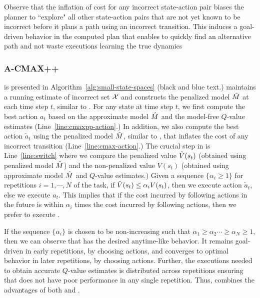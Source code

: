 Observe that the inflation of cost for any incorrect state-action pair
biases the planner to ``explore" all other state-action pairs that are
not yet known to be incorrect before it plans a path using an
incorrect transition. This induces a goal-driven behavior in the
computed plan that enables \cmax{} to quickly find an alternative path
and not waste executions learning the true dynamics

\subsubsection{A-CMAX++}
\label{sec:acmaxpp}
\acmaxpp{} is presented in
Algorithm~\ref{alg:small-state-spaces} (black and blue text.)
\acmaxpp{} maintains a running estimate of incorrect set
$\mathcal{X}$ and constructs the penalized model $\tilde{M}$ at each
time step $t$, similar to \cmax{}. For any state at time step $t$, we
first compute the best action $a_t$ based on the approximate model
$\hat{M}$ and the model-free $Q$-value estimates
(Line~\ref{line:cmaxpp-action}.) In addition, we also compute the best
action $\tilde{a}_t$ using the penalized model $\tilde{M}$, similar to
\cmax{}, that inflates the cost of any incorrect transition
(Line~\ref{line:cmax-action}.) The crucial step in \acmaxpp{}
is Line~\ref{line:switch} where we compare the penalized value
$\tilde{V}(s_t)$ (obtained using penalized model $\tilde{M}$) and the
non-penalized value $V(s_t)$ (obtained using approximate model $\hat{M}$
and $Q$-value estimates.) Given a sequence $\{\alpha_i \geq 1\}$ for
repetitions $i=1,\cdots,N$ of the task, if $\tilde{V}(s_t) \leq
\alpha_iV(s_t)$, then we execute action $\tilde{a}_t$, else we execute
$a_t$. This implies that if the cost incurred by following \cmax{}
actions in the future is within $\alpha_i$ times the cost incurred by
following \cmaxpp{} actions, then we prefer to execute \cmax{}.

If
the sequence $\{\alpha_i\}$ is chosen to be non-increasing such that
$\alpha_1 \geq \alpha_2 \cdots \geq \alpha_N \geq 1$, then we can observe that
\acmaxpp{} has the desired anytime-like behavior. It remains goal-driven in
early repetitions, by choosing \cmax{} actions, and
converges to optimal behavior in later repetitions, by choosing
\cmaxpp{} actions. Further, the
executions needed to obtain accurate $Q$-value estimates is
distributed across repetitions ensuring that \acmaxpp{} does
not have poor performance in any single repetition. Thus,
\acmaxpp{} combines the advantages of both \cmax{} and \cmaxpp{}.


